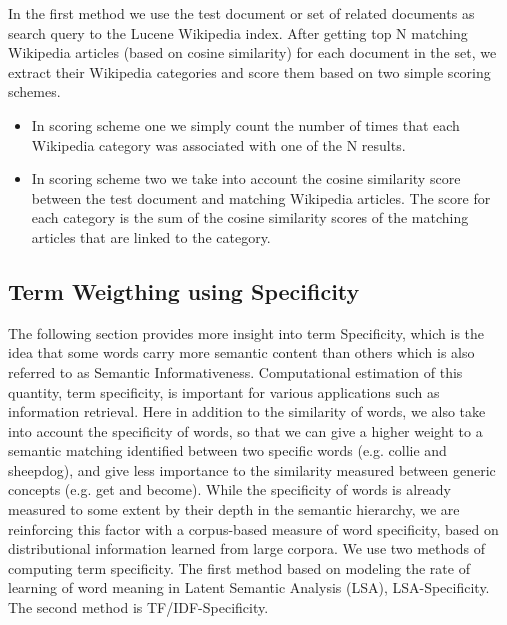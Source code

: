 In the first method we use the test document or set of related documents as search query to the Lucene Wikipedia index. After getting top N matching Wikipedia articles (based on cosine similarity) for each document in the set, we extract their Wikipedia categories and score them based on two simple scoring schemes.
\begin{itemize}
\item In scoring scheme one we simply count the number of times that each Wikipedia category was associated with one of the N results.
\item In scoring scheme two we take into account the cosine similarity score between the test document and matching Wikipedia articles. The score for each category is the sum of the cosine similarity scores of the matching articles that are linked to the category.
\end{itemize}

\subsection{Term Weigthing using Specificity}
The following section provides more insight into term Specificity, which is the idea that some words carry more semantic content than others which is also referred to as Semantic Informativeness. Computational estimation of this quantity, term specificity, is important for various applications such as information retrieval. Here in addition to the similarity of words, we also take into account the specificity of words, so that we can give a higher weight to a semantic matching identified between two specific words (e.g. collie and sheepdog), and give less importance to the similarity measured between generic concepts (e.g. get and become). While the specificity of words is already measured to some extent by their depth in the semantic hierarchy, we are reinforcing this factor with a corpus-based measure of word specificity, based on distributional information learned from large corpora.
We use two methods of computing term specificity. The first method based on modeling the rate of learning of word meaning in Latent Semantic Analysis (LSA), LSA-Specificity. The second method is TF/IDF-Specificity.

